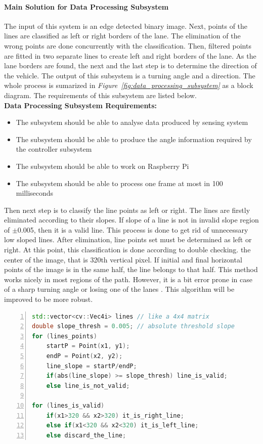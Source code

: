 \documentclass[a4paper,12pt]{article}
\begin{document}
	\paragraph{Main Solution for Data Processing Subsystem}
	
	The input of this system is an edge detected binary image.  Next, points of the lines are classified as left or right borders of the lane. The elimination of the wrong points are done concurrently with the classification. Then, filtered points are fitted in two separate lines to create left and right borders of the lane. As the lane borders are found, the next and the last step is to determine the direction of the vehicle. The output of this subsystem is a turning angle and a direction. The whole process is sumarized in \textit{Figure~\ref{fig:data_processing_subsystem}} as a block diagram. The requirements of this subsystem are listed below.\\
	
	\textbf{Data Processing Subsystem Requirements:}	
	
	\begin{itemize}
		\item The subsystem should be able to analyse data produced by sensing system
		\item The subsystem should be able to produce the angle information required by the controller subsystem
		\item The subsystem should be able to work on Raspberry Pi
		\item The subsystem should be able to process one frame at most in 100 milliseconds
	\end{itemize}

	Then next step is to classify the line points as left or right. The lines are firstly eliminated according to their slopes. If slope of a line is not in invalid slope region of $\pm$0.005, then it is a valid line. This process is done to get rid of unnecessary low sloped lines. After elimination, line points set must be determined as left or right. At this point, this classification is done according to double checking. the center of the image, that is 320th vertical pixel. If initial and final horizontal points of the image is in the same half, the line belongs to that half. This method works nicely in most regions of the path. However, it is a bit error prone in case of a sharp turning angle or losing one of the lanes . This algorithm will be improved to be more robust.
	\begin{lstlisting}[language=C++,float=t,numbers=left,frame=single,caption=The Algorithm to Classify the Lane Lines as Right or Left, captionpos=b, label=sc:left-right-lines]
std::vector<cv::Vec4i> lines // like a 4x4 matrix
double slope_thresh = 0.005; // absolute threshold slope
for (lines_points)
	startP = Point(x1, y1);
	endP = Point(x2, y2);
	line_slope = startP/endP;
	if(abs(line_slope) >= slope_thresh) line_is_valid;
	else line_is_not_valid;

for (lines_is_valid)	
	if(x1>320 && x2>320) it_is_right_line;
	else if(x1<320 && x2<320) it_is_left_line;
	else discard_the_line;
	\end{lstlisting}
	
\end{document}
